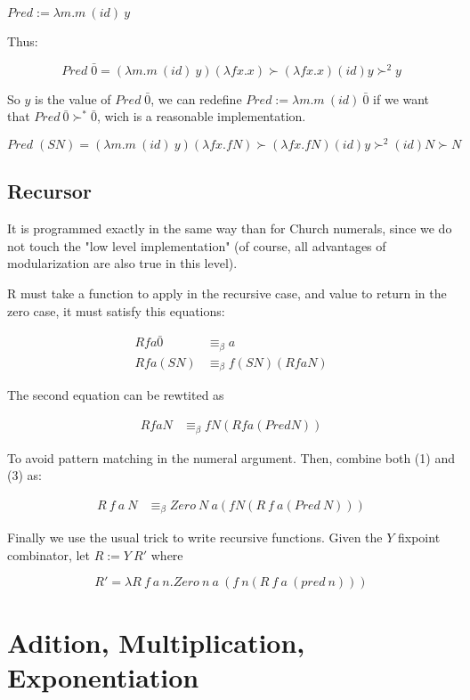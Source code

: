 $Pred := \lambda m . m \: (id) \: y$

Thus:

$$
Pred \; \bar{0} = (\lambda m . m \: (id) \: y) (\lambda f x. x)
\succ (\lambda f x. x) (id) y \succ^{2} y
$$

So $y$ is the value of $Pred \; \bar{0}$, we can redefine
$Pred := \lambda m . m \: (id) \: \bar{0}$ if we want that
$Pred \: \bar{0} \succ^{*} \bar{0}$, wich is a reasonable implementation.

$$
Pred \; (S N) = (\lambda m . m \: (id) \: y) (\lambda f x. f N)
\succ (\lambda f x. f N) (id) y \succ^{2} (id) N \succ N
$$

\subsection*{Recursor}

It is programmed exactly in the same way than for Church numerals, since we
do not touch the "low level implementation" (of course, all advantages of
modularization are also true in this level).

R must take a function to apply in the recursive case, and value to return
in the zero case, it must satisfy this equations:


\begin{align}
  R f a \bar{0} &\equiv_{\beta} a \\
  R f a (S N) &\equiv_{\beta} f (S N) (R f a N)
\end{align}

The second equation can be rewtited as

\begin{align}
  R f a N &\equiv_{\beta} f N (R f a (Pred N))
\end{align}

To avoid pattern matching in the numeral argument. Then, combine both (1) and
(3) as:

\begin{align}
  R \: f \: a \: N &\equiv_{\beta} Zero \: N \:a (f N (R \: f \:a (Pred\: N)))
\end{align}

Finally we use the usual trick to write recursive functions. Given the $Y$
fixpoint combinator, let $R := Y \: R'$ where

$$
R' = \lambda R \:f \:a \:n . Zero \: n\: a\: (f\: n (R \:f \:a \:(pred \: n)))
$$

\section*{Adition, Multiplication, Exponentiation}

